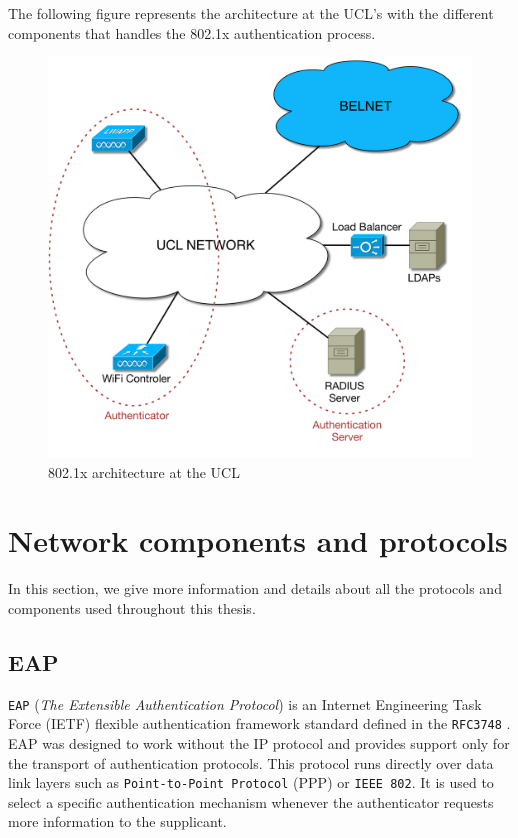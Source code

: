 The following figure represents the architecture at the UCL's with the different components that handles the 802.1x authentication process. 

\begin{figure}[H]
	\includegraphics[width=1\linewidth]{Pictures/Chapter2/802-archi.png}
	\caption{802.1x architecture at the UCL}
\end{figure}



\section{Network components and protocols}
In this section, we give more information and details about all the protocols and components used throughout this thesis.

\subsection{EAP}
\texttt{EAP} (\textit{The Extensible Authentication Protocol}) is an Internet Engineering Task Force (IETF) flexible authentication framework standard defined in the \texttt{RFC3748} \cite{rfc3748}. EAP was designed to work without the IP protocol and provides support only for the transport of authentication protocols. This protocol runs directly over data link layers such as \texttt{Point-to-Point Protocol} (PPP) or \texttt{IEEE 802}. It is used to select a specific authentication mechanism whenever the authenticator requests more information to the supplicant.

